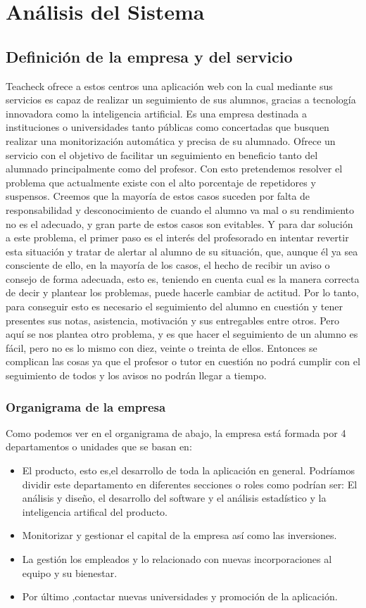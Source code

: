 \chapter{Análisis del Sistema}
\section{Definición de la empresa y del servicio}
Teacheck ofrece a estos centros una aplicación web con la cual
mediante sus servicios es capaz de realizar un seguimiento de sus
alumnos, gracias a tecnología innovadora como la inteligencia
artificial.  Es una empresa destinada a instituciones o universidades
tanto públicas como concertadas que busquen realizar una
monitorización automática y precisa de su alumnado. Ofrece un servicio
con el objetivo de facilitar un seguimiento en beneficio tanto del
alumnado principalmente como del profesor. Con esto pretendemos
resolver el problema que actualmente existe con el alto porcentaje de
repetidores y suspensos. Creemos que la mayoría de estos casos suceden
por falta de responsabilidad y desconocimiento de cuando el alumno va
mal o su rendimiento no es el adecuado, y gran parte de estos casos
son evitables. Y para dar solución a este problema, el primer paso es
el interés del profesorado en intentar revertir esta situación y
tratar de alertar al alumno de su situación, que, aunque él ya sea
consciente de ello, en la mayoría de los casos, el hecho de recibir un
aviso o consejo de forma adecuada, esto es, teniendo en cuenta cual es
la manera correcta de decir y plantear los problemas, puede hacerle
cambiar de actitud. Por lo tanto, para conseguir esto es necesario el
seguimiento del alumno en cuestión y tener presentes sus notas,
asistencia, motivación y sus entregables entre otros. Pero aquí se nos
plantea otro problema, y es que hacer el seguimiento de un alumno es
fácil, pero no es lo mismo con diez, veinte o treinta de
ellos. Entonces se complican las cosas ya que el profesor o tutor en
cuestión no podrá cumplir con el seguimiento de todos y los avisos no
podrán llegar a tiempo.
\subsection{Organigrama de la empresa}
Como podemos ver en el organigrama de abajo, la empresa está formada
por 4 departamentos o unidades que se basan en:
\begin{itemize}
\item{El producto, esto es,el desarrollo de toda la aplicación en
  general. Podríamos dividir este departamento en diferentes secciones
  o roles como podrían ser: El análisis y diseño, el desarrollo del
  software y el análisis estadístico y la inteligencia artifical del
  producto.}
\item{Monitorizar y gestionar el capital de la empresa así como las
  inversiones.}
\item{La gestión los empleados y lo relacionado con nuevas
  incorporaciones al equipo y su bienestar.}
\item{Por último ,contactar nuevas universidades y promoción de la
  aplicación.}
\end{itemize}
\subparagraph{}
